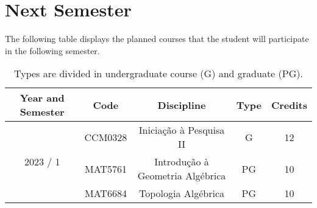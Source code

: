\documentclass[11pt, reqno]{amsart}
\theoremstyle{definition}
\begin{document}
\section{Next Semester}

The following table displays the planned courses that the student will
participate in the following semester.

\begin{table}[h!]\label{tab:disc}
  \centering
  \caption{Types are divided in undergraduate course (G) and graduate (PG).}
  \begin{tabular}{ |c|c|c|c|c| }
    \hline
    Year and Semester & Code & Discipline & Type & Credits \\
    \hline
    \multirow{3}{*}{2023 / 1}
                   & CCM0328 & Iniciação à Pesquisa II            & G  & 12 \\
                   & MAT5761 & Introdução à Geometria Algébrica   & PG & 10 \\
                   & MAT6684 & Topologia Algébrica                & PG & 10 \\
    \hline
\end{tabular}
\end{table}
\end{document}
